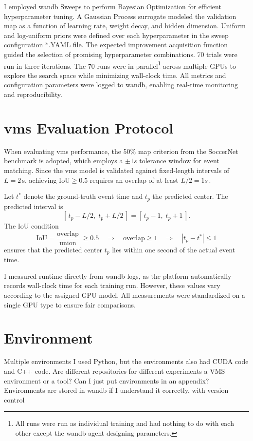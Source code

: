 I employed \acrshort{wandb} Sweeps to perform Bayesian Optimization for efficient hyperparameter tuning. A Gaussian Process surrogate modeled the validation \acrshort{map} as a function of learning rate, weight decay, and hidden dimension. Uniform and log-uniform priors were defined over each hyperparameter in the sweep configuration *.YAML file. The expected improvement acquisition function guided the selection of promising hyperparameter combinations. 70 trials were run in three iterations. The 70 runs were in parallel\footnote{All runs were run as individual training and had nothing to do with each other except the \acrshort{wandb} agent designing parameters. } across multiple GPUs to explore the search space while minimizing wall-clock time. All metrics and configuration parameters were logged to \acrshort{wandb}, enabling real-time monitoring and reproducibility. 





\section{\acrshort{vms} Evaluation Protocol}
When evaluating \acrshort{vms} performance, the 50\% \acrshort{map} criterion from the SoccerNet benchmark is adopted, which employs a $\pm1s$ tolerance window for event matching. Since the \acrshort{vms} model is validated against fixed‐length intervals of $L = 2\,$s, achieving $\mathrm{IoU}\ge0.5$ requires an overlap of at least $L/2 = 1s\,$.

Let $t^*$ denote the ground‐truth event time and $t_p$ the predicted center. The predicted interval is
\[
    [\,t_p - L/2,\;t_p + L/2\,]
    = [\,t_p - 1,\;t_p + 1\,].
\] 
The IoU condition
\[
    \mathrm{IoU}
    = \frac{\text{overlap}}{\text{union}}
    \;\ge0.5
    \quad\Longrightarrow\quad
    \text{overlap}\ge1
    \quad\Longrightarrow\quad
    |t_p - t^*|\le1
\]
ensures that the predicted center $t_p$ lies within one second of the actual event time.

I measured runtime directly from \acrshort{wandb} logs, as the platform automatically records wall-clock time for each training run. However, these values vary according to the assigned GPU model. All measurements were standardized on a single GPU type to ensure fair comparisons. 

\section{Environment} 

Multiple environments
I used Python, but the environments also had CUDA code and C++ code. 
Are different repositories for different experiments
a VMS environment or a tool?
Can I just put environments in an appendix? Environments are stored in wandb if I understand it correctly, with version control